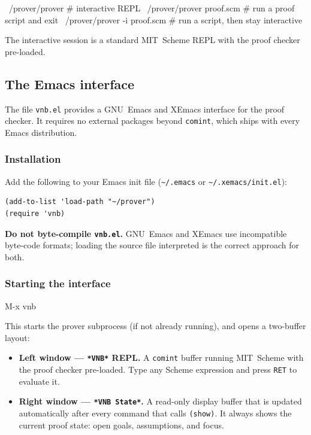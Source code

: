 \documentclass{amsbook}[openany]
\theoremstyle{definition}
\theoremstyle{remark}
\theoremstyle{remark}
\begin{document}
\begin{VNBsnip}
~/prover/prover              # interactive REPL
~/prover/prover proof.scm    # run a proof script and exit
~/prover/prover -i proof.scm # run a script, then stay interactive
\end{VNBsnip}

The interactive session is a standard MIT~Scheme REPL with the proof
checker pre-loaded.
\subsection{The Emacs interface}
\label{sec:emacs}

The file \texttt{vnb.el} provides a GNU~Emacs and XEmacs interface for
the proof checker.  It requires no external packages beyond
\texttt{comint}, which ships with every Emacs distribution.

\subsubsection{Installation}

Add the following to your Emacs init file (\texttt{\textasciitilde/.emacs}
or \texttt{\textasciitilde/.xemacs/init.el}):

\begin{verbatim}
(add-to-list 'load-path "~/prover")
(require 'vnb)
\end{verbatim}

\noindent
\textbf{Do not byte-compile \texttt{vnb.el}.}  GNU~Emacs and XEmacs use
incompatible byte-code formats; loading the source file interpreted is
the correct approach for both.

\subsubsection{Starting the interface}

\begin{VNBsnip}
M-x vnb
\end{VNBsnip}

This starts the prover subprocess (if not already running), and opens a
two-buffer layout:
\begin{itemize}[label=\textendash, leftmargin=1cm]
\item \textbf{Left window --- \texttt{*VNB*} REPL.}  A \texttt{comint}
  buffer running MIT~Scheme with the proof checker pre-loaded.  Type any
  Scheme expression and press \texttt{RET} to evaluate it.
\item \textbf{Right window --- \texttt{*VNB State*}.}  A read-only
  display buffer that is updated automatically after every command that
  calls \texttt{(show)}.  It always shows the current proof state: open
  goals, assumptions, and focus.
\end{itemize}
\end{document}
